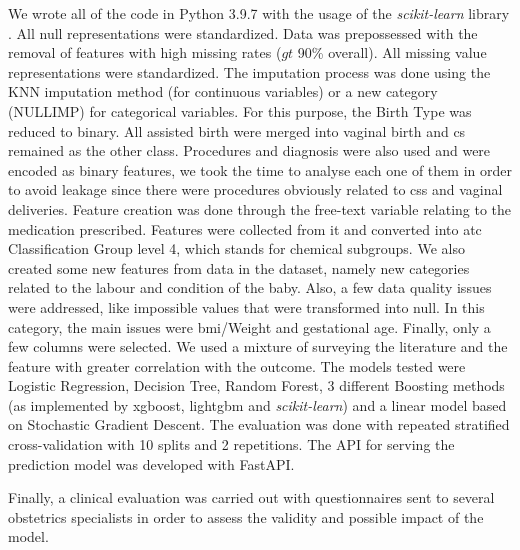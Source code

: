 We wrote all of the code in Python 3.9.7 with the usage of the \textit{scikit-learn} library \cite{scikit-learn}. All null representations were standardized. Data was prepossessed with the removal of features with high missing rates ($gt$ 90\% overall). All missing value representations were standardized. The imputation process was done using the KNN imputation method (for continuous variables) or a new category (NULLIMP) for categorical variables. 
For this purpose, the Birth Type was reduced to binary. All assisted birth were merged into vaginal birth and \ac{cs} remained as the other class. Procedures and diagnosis were also used and were encoded as binary features, we took the time to analyse each one of them in order to avoid leakage since there were procedures obviously related to \acp{cs} and vaginal deliveries.
Feature creation was done through the free-text variable relating to the medication prescribed. Features were collected from it and converted into \ac{atc} Classification Group level 4, which stands for chemical subgroups. We also created some new features from data in the dataset, namely new categories related to the labour and condition of the baby.
Also, a few data quality issues were addressed, like impossible values that were transformed into null. In this category, the main issues were \ac{bmi}/Weight and gestational age.
Finally, only a few columns were selected. We used a mixture of surveying the literature and the feature with greater correlation with the outcome.
The models tested were Logistic Regression, Decision Tree, Random Forest, 3 different Boosting methods (as implemented by \ac{xgboost}, \ac{lightgbm} and \textit{scikit-learn}) and a linear model based on Stochastic Gradient Descent.
The evaluation was done with repeated stratified cross-validation with 10 splits and 2 repetitions.
The API for serving the prediction model was developed with FastAPI.

Finally, a clinical evaluation was carried out with questionnaires sent to several obstetrics specialists in order to assess the validity and possible impact of the model.
